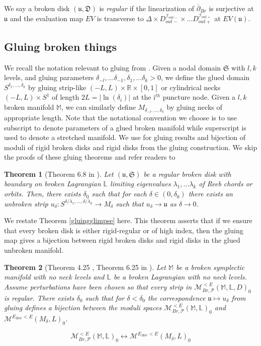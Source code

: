 \documentclass[11pt, oneside,dvipsnames]{amsart}
\renewcommand{\to}{\rightarrow}
\newcommand{\R}{\mathbb{R}}
\newcommand{\delbar}{\overline{\partial}}
\newcommand{\interval}{[0,1]}
\renewcommand{\to}{\rightarrow}
\newcommand{\<}{\langle}
\renewcommand{\>}{\rangle}
\newcommand{\outp}{{out+}}
\newcommand{\outm}{{out-}}
\newcommand{\M}{\mathcal{M}}
\newcommand{\bL}{\mathbb{L}}
\newcommand{\cI}{\mathcal{I}}
\renewcommand{\to}{\rightarrow}
\newtheorem{Theorem}{Theorem}[section]
\theoremstyle{definition}
\theoremstyle{definition}
\numberwithin{equation}{subsection}
\begin{document}
We say a broken disk $(\mathfrak{u},\mathfrak{D})$ is \textit{regular} if the linearization of $\delbar_{Br}$ is surjective at $\mathfrak{u}$ and the evaluation map $EV$ is transverse to $\Delta \times D_\outm ^{\cI_\outm}  \times \dots D_\outp^{\cI_\outp}$ at $EV(\mathfrak{u}).$


\subsection{Gluing broken things}

We recall the notation relevant to gluing from \cite{PW19}.  Given a nodal domain $\mathfrak{S}$ with $l,k$ levels, and gluing parameters $\delta_{-l},\dots \delta_{-1},\delta_1,\dots \delta_k > 0$, we define the glued domain $S^{\delta_1,\dots,\delta_k}$ by gluing strip-like $(-L,L) \times \R \times \interval$ or cylindrical necks $(-L,L) \times S^1$ of length $2L =|\ln (\delta_i)|$ at the i$^{th}$ puncture node. Given a $l,k $ broken manifold $\mathbb M$, we can similarly define $M_{\delta_{-l},\dots,\delta_k}$ by gluing necks of appropriate length. Note that the notational convention we choose is to use subscript to denote parameters of a glued broken manifold while superscript is used to denote a stretched manifold. We use \cite{PW19} for gluing results and  bijection of moduli of rigid broken disks and rigid disks from the gluing construction. We skip the proofs of these gluing theorems and refer readers to \cite[\S 6.5]{PW19}

\begin{Theorem}[Theorem 6.8 in \cite{PW19}]
Let $(\mathfrak{u,S})$ be a regular broken disk with boundary on broken Lagrangian $\bL$  limiting eigenvalues $\lambda_1,\dots\lambda_k$ of Reeb chords or orbits. Then, there exists  $\delta_0$ such that for each $\delta \in (0,\delta_0)$ there exists an unbroken strip $u_\delta: S^{\delta/\lambda_1,\dots,\delta/\lambda_k} \to M_\delta$ such that $u_\delta \to \mathfrak{u}$ as $\delta \to 0$.
\end{Theorem}

\noindent We restate Theorem \ref{gluingglimpse} here. This theorem asserts that if we ensure that every broken disk is either rigid-regular or of high index, then the gluing map gives a bijection between rigid broken disks and rigid disks in the glued unbroken manifold.

\begin{Theorem}[Theorem 4.25 \cite{Cha23}, Theorem 6.25 in \cite{PW19}]\label{glu}
    Let $\mathbb M$ be a broken symplectic manifold with no neck levels and $\mathbb L$  be a broken Lagrangian with no neck levels.  Assume perturbations have been chosen so that every strip in $\mathcal{M}^{<E}_{Br,\mathcal{P}}(\mathbb{M},\mathbb{L},D)_0$ is regular. There exists $\delta_0$ such that for $ \delta <\delta_0$ the correspondence $\mathfrak{u} \mapsto u_\delta$ from gluing defines a bijection between the moduli spaces $\M^{<E}_{Br,\mathcal{P}}(\mathbb{M},\mathbb{L})_0$ and $\mathcal M ^{E_{Hor}< E}(M_{\delta},L)_0$.



$$\M^{<E}_{Br,\mathcal{P}}(\mathbb{M},\mathbb{L})_0 \leftrightarrow \mathcal M ^{E_{Hor}< E}(M_{\delta},L)_0$$
\end{Theorem}
\end{document}
